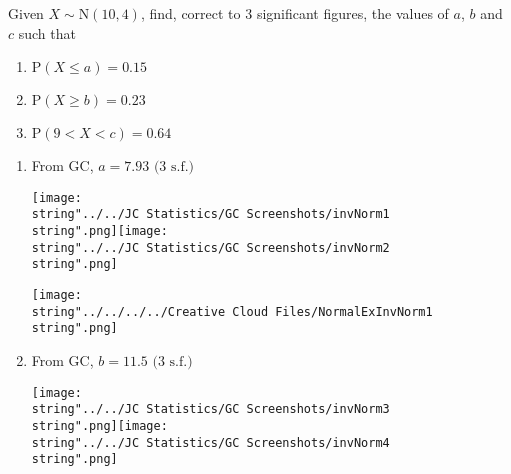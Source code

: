 \documentclass[11pt,a4paper]{book}
\begin{document}
\begin{example}

Given $X\sim\text{N}\left(10,4\right)$, find, correct to 3 significant
figures, the values of $a$, $b$ and $c$ such that

\begin{enumerate}[label=(\alph*)] 

\item  $\text{P}\left(X\leq a\right)=0.15$

\item  $\text{P}\left(X\geq b\right)=0.23$

\item  $\text{P}\left(9<X<c\right)=0.64$

\end{enumerate}

\Solution

\begin{enumerate}[label=(\alph*)] 

\item  

\begin{minipage}[t]{.6\textwidth}

From GC, $a=7.93\text{ (3 s.f.)}$

\texttt{[image: \\string"../../JC Statistics/GC Screenshots/invNorm1\\string".png]}\hspace{1cm}\texttt{[image: \\string"../../JC Statistics/GC Screenshots/invNorm2\\string".png]}

\end{minipage}
\begin{minipage}[t]{.3\textwidth}
\begin{center}
\texttt{[image: \\string"../../../../Creative Cloud Files/NormalExInvNorm1\\string".png]}
\par\end{center}

\end{minipage}

\item  \begin{minipage}[t]{.6\textwidth}

From GC, $b=11.5\text{ (3 s.f.)}$

\texttt{[image: \\string"../../JC Statistics/GC Screenshots/invNorm3\\string".png]}\hspace{1cm}\texttt{[image: \\string"../../JC Statistics/GC Screenshots/invNorm4\\string".png]}


\end{minipage}
\end{enumerate}
\end{example}
\end{document}
